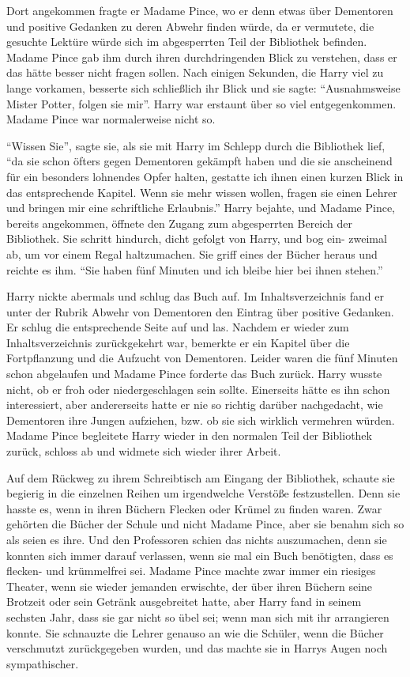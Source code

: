 Dort angekommen fragte er Madame Pince, wo er denn etwas über Dementoren und positive Gedanken zu deren Abwehr finden würde, da er vermutete, die gesuchte Lektüre würde sich im abgesperrten Teil der Bibliothek befinden. Madame Pince gab ihm durch ihren durchdringenden Blick zu verstehen, dass er das hätte besser nicht fragen sollen. Nach einigen Sekunden, die Harry viel zu lange vorkamen, besserte sich schließlich ihr Blick und sie sagte: \enquote{Ausnahmsweise Mister Potter, folgen sie mir}. Harry war erstaunt über so viel entgegenkommen. Madame Pince war normalerweise nicht so.

\enquote{Wissen Sie}, sagte sie, als sie mit Harry im Schlepp durch die Bibliothek lief, \enquote{da sie schon öfters gegen Dementoren gekämpft haben und die sie anscheinend für ein besonders lohnendes Opfer halten, gestatte ich ihnen einen kurzen Blick in das entsprechende Kapitel. Wenn sie mehr wissen wollen, fragen sie einen Lehrer und bringen mir eine schriftliche Erlaubnis.} Harry bejahte, und Madame Pince, bereits angekommen, öffnete den Zugang zum abgesperrten Bereich der Bibliothek. Sie schritt hindurch, dicht gefolgt von Harry, und bog ein- zweimal ab, um vor einem Regal haltzumachen. Sie griff eines der Bücher heraus und reichte es ihm. \enquote{Sie haben fünf Minuten und ich bleibe hier bei ihnen stehen.}

Harry nickte abermals und schlug das Buch auf. Im Inhaltsverzeichnis fand er unter der Rubrik Abwehr von Dementoren den Eintrag über positive Gedanken. Er schlug die entsprechende Seite auf und las. Nachdem er wieder zum Inhaltsverzeichnis zurückgekehrt war, bemerkte er ein Kapitel über die Fortpflanzung und die Aufzucht von Dementoren. Leider waren die fünf Minuten schon abgelaufen und Madame Pince forderte das Buch zurück. Harry wusste nicht, ob er froh oder niedergeschlagen sein sollte. Einerseits hätte es ihn schon interessiert, aber andererseits hatte er nie so richtig darüber nachgedacht, wie Dementoren ihre Jungen aufziehen, bzw. ob sie sich wirklich vermehren würden. Madame Pince begleitete Harry wieder in den normalen Teil der Bibliothek zurück, schloss ab und widmete sich wieder ihrer Arbeit.

Auf dem Rückweg zu ihrem Schreibtisch am Eingang der Bibliothek, schaute sie begierig in die einzelnen Reihen um irgendwelche Verstöße festzustellen. Denn sie hasste es, wenn in ihren Büchern Flecken oder Krümel zu finden waren. Zwar gehörten die Bücher der Schule und nicht Madame Pince, aber sie benahm sich so als seien es ihre. Und den Professoren schien das nichts auszumachen, denn sie konnten sich immer darauf verlassen, wenn sie mal ein Buch benötigten, dass es flecken- und krümmelfrei sei. Madame Pince machte zwar immer ein riesiges Theater, wenn sie wieder jemanden erwischte, der über ihren Büchern seine Brotzeit oder sein Getränk ausgebreitet hatte, aber Harry fand in seinem sechsten Jahr, dass sie gar nicht so übel sei; wenn man sich mit ihr arrangieren konnte. Sie schnauzte die Lehrer genauso an wie die Schüler, wenn die Bücher verschmutzt zurückgegeben wurden, und das machte sie in Harrys Augen noch sympathischer.

